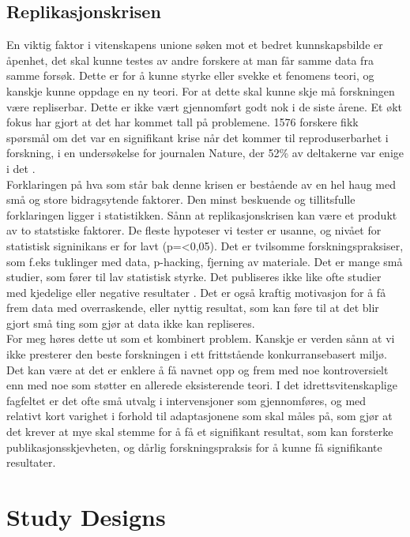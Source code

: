 \documentclass[
]{book}
\begin{document}
\hypertarget{replikasjonskrisen}{%
\section{Replikasjonskrisen}\label{replikasjonskrisen}}

En viktig faktor i vitenskapens unione søken mot et bedret kunnskapsbilde er åpenhet, det skal kunne testes av andre forskere at man får samme data fra samme forsøk. Dette er for å kunne styrke eller svekke et fenomens teori, og kanskje kunne oppdage en ny teori. For at dette skal kunne skje må forskningen være repliserbar. Dette er ikke vært gjennomført godt nok i de siste årene. Et økt fokus har gjort at det har kommet tall på problemene. 1576 forskere fikk spørsmål om det var en signifikant krise når det kommer til reproduserbarhet i forskning, i en undersøkelse for journalen Nature, der 52\% av deltakerne var enige i det \citep{Baker2016}.\\
Forklaringen på hva som står bak denne krisen er bestående av en hel haug med små og store bidragsytende faktorer. Den minst beskuende og tillitsfulle forklaringen ligger i statistikken. Sånn at replikasjonskrisen kan være et produkt av to statstiske faktorer. De fleste hypoteser vi tester er usanne, og nivået for statistisk signinikans er for lavt (p=\textless0,05). Det er tvilsomme forskningspraksiser, som f.eks tuklinger med data, p-hacking, fjerning av materiale. Det er mange små studier, som fører til lav statistisk styrke. Det publiseres ikke like ofte studier med kjedelige eller negative resultater \citep{bird2020}. Det er også kraftig motivasjon for å få frem data med overraskende, eller nyttig resultat, som kan føre til at det blir gjort små ting som gjør at data ikke kan repliseres\citep{romero2017}.\\
For meg høres dette ut som et kombinert problem. Kanskje er verden sånn at vi ikke presterer den beste forskningen i ett frittstående konkurransebasert miljø. Det kan være at det er enklere å få navnet opp og frem med noe kontroversielt enn med noe som støtter en allerede eksisterende teori. I det idrettsvitenskaplige fagfeltet er det ofte små utvalg i intervensjoner som gjennomføres, og med relativt kort varighet i forhold til adaptasjonene som skal måles på, som gjør at det krever at mye skal stemme for å få et signifikant resultat, som kan forsterke publikasjonsskjevheten, og dårlig forskningspraksis for å kunne få signifikante resultater.

\hypertarget{study-designs}{%
\chapter{\texorpdfstring{\textbf{Study Designs}}{Study Designs}}\label{study-designs}}
\end{document}
